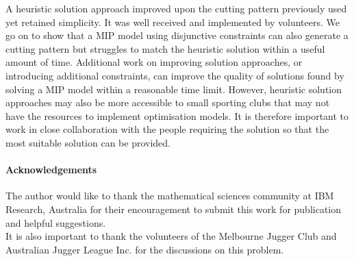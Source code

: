 \documentclass[10pt,a4paper]{article}
\begin{document}
A heuristic solution approach improved upon the cutting pattern previously used yet retained simplicity. It was well received and implemented by volunteers. We go on to show that a MIP model using disjunctive constraints can also generate a cutting pattern but struggles to match the heuristic solution within a useful amount of time. Additional work on improving solution approaches, or introducing additional constraints, can improve the quality of solutions found by solving a MIP model within a reasonable time limit. However, heuristic solution approaches may also be more accessible to small sporting clubs that may not have the resources to implement optimisation models. It is therefore important to work in close collaboration with the people requiring the solution so that the most suitable solution can be provided.

\paragraph{Acknowledgements}
The author would like to thank the mathematical sciences community at IBM Research, Australia for their encouragement to submit this work for publication and helpful suggestions.\\
It is also important to thank the volunteers of the Melbourne Jugger Club and Australian Jugger League Inc. for the  discussions on this problem.



\end{document}
